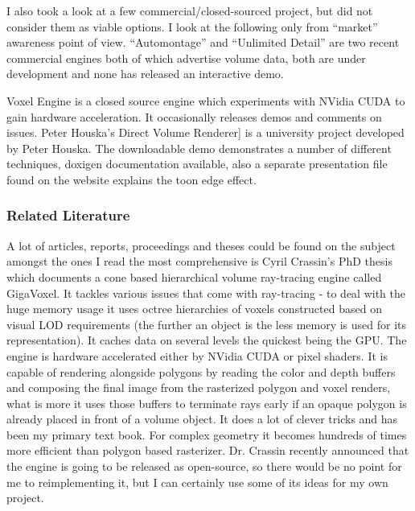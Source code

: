 \documentclass[11pt,fleqn,twoside]{article}
\begin{document}
I also took a look at a few commercial/closed-sourced project, but did not consider them as viable options. I look at the following only from ``market'' awareness point of view. ``Automontage''\cite{Automontage} and ``Unlimited Detail''\cite{UnlimitedDetail} are two recent commercial engines both of which advertise volume data, both are under development and none has released an interactive demo.

Voxel Engine\cite{VoxelEngineDevelopment} is a closed source engine which experiments with NVidia CUDA to gain hardware acceleration. It occasionally releases demos and comments on issues. Peter Houska's Direct Volume Renderer\cite{PHDVR}] is a university project developed by Peter Houska. The downloadable demo demonstrates a number of different techniques, doxigen documentation available, also a separate presentation file found on the website explains the toon edge effect.


\subsubsection{Related Literature}

A lot of articles, reports, proceedings and theses could be found on the subject amongst the ones I read the most comprehensive is Cyril Crassin's PhD thesis\cite{CCrassinThesis} which documents a cone based hierarchical volume ray-tracing engine called GigaVoxel. It tackles various issues that come with ray-tracing - to deal with the huge memory usage it uses octree hierarchies of voxels constructed based on visual LOD requirements (the further an object is the less memory is used for its representation). It caches data on several levels the quickest being the GPU. The engine is hardware accelerated either by NVidia CUDA or pixel shaders. It is capable of rendering alongside polygons by reading the color and depth buffers and composing the final image from the rasterized  polygon and voxel renders, what is more it uses those buffers to terminate rays early if an opaque polygon is already placed in front of a volume object. It does a lot of clever tricks and has been my primary text book. For complex geometry it becomes hundreds of times more efficient than polygon based rasterizer. Dr. Crassin recently announced that the engine is going to be released as open-source, so there would be no point for me to reimplementing it, but I can certainly use some of its ideas for my own project.
\end{document}
